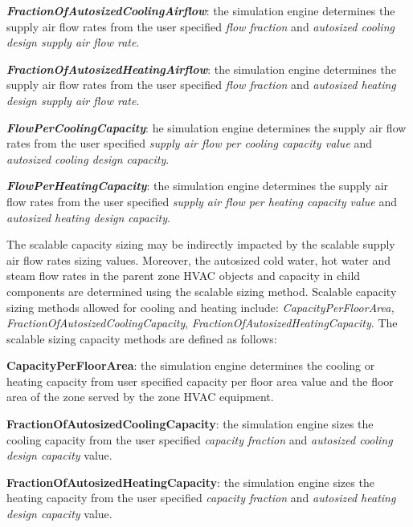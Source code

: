 \textbf{\emph{FractionOfAutosizedCoolingAirflow}}: the simulation engine determines the supply air flow rates from the user specified \emph{flow fraction} and \emph{autosized cooling design supply air flow rate}.

\textbf{\emph{FractionOfAutosizedHeatingAirflow}}: the simulation engine determines the supply air flow rates from the user specified \emph{flow fraction} and \emph{autosized heating design supply air flow rate}.

\textbf{\emph{FlowPerCoolingCapacity}}: he simulation engine determines the supply air flow rates from the user specified \emph{supply air flow per cooling capacity value} and \emph{autosized cooling design capacity}.

\textbf{\emph{FlowPerHeatingCapacity}}: the simulation engine determines the supply air flow rates from the user specified \emph{supply air flow per heating capacity value} and \emph{autosized heating design capacity}.

The scalable capacity sizing may be indirectly impacted by the scalable supply air flow rates sizing values. Moreover, the autosized cold water, hot water and steam flow rates in the parent zone HVAC objects and capacity in child components are determined using the scalable sizing method. Scalable capacity sizing methods allowed for cooling and heating include: \emph{CapacityPerFloorArea, FractionOfAutosizedCoolingCapacity}, \emph{FractionOfAutosizedHeatingCapacity}. The scalable sizing capacity methods are defined as follows:

\textbf{CapacityPerFloorArea}: the simulation engine determines the cooling or heating capacity from user specified capacity per floor area value and the floor area of the zone served by the zone HVAC equipment.

\textbf{FractionOfAutosizedCoolingCapacity}: the simulation engine sizes the cooling capacity from the user specified \emph{capacity fraction} and \emph{autosized cooling design capacity} value.

\textbf{FractionOfAutosizedHeatingCapacity}: the simulation engine sizes the heating capacity from the user specified \emph{capacity fraction} and \emph{autosized heating design capacity} value.
